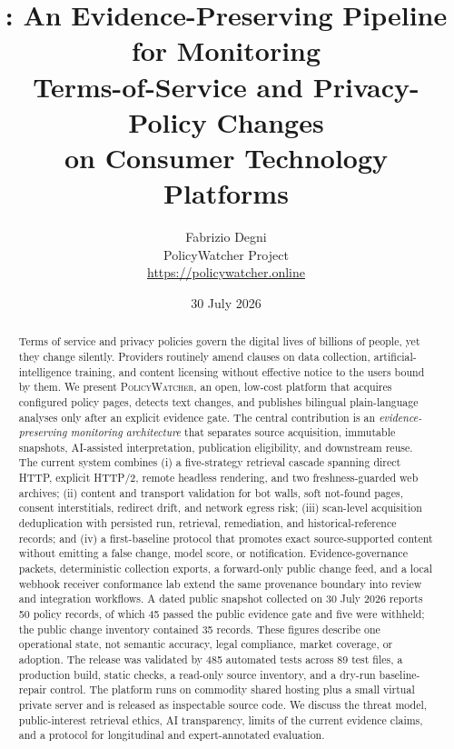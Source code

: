 \documentclass[11pt]{article}
\title{\pw: An Evidence-Preserving Pipeline for Monitoring\\
Terms-of-Service and Privacy-Policy Changes\\
on Consumer Technology Platforms}
\author{
  Fabrizio Degni\\
  \small PolicyWatcher Project\\
  \small \url{https://policywatcher.online}
}
\date{30 July 2026}
\newcommand{\pw}{\textsc{PolicyWatcher}}
\begin{document}
\maketitle

\begin{abstract}
Terms of service and privacy policies govern the digital lives of billions of
people, yet they change silently. Providers routinely amend clauses on data
collection, artificial-intelligence training, and content licensing without
effective notice to the users bound by them. We present \pw, an open, low-cost
platform that acquires configured policy pages, detects text changes, and
publishes bilingual plain-language analyses only after an explicit evidence
gate. The central contribution is an \emph{evidence-preserving monitoring
architecture} that separates source acquisition, immutable snapshots,
AI-assisted interpretation, publication eligibility, and downstream reuse. The
current system combines (i) a five-strategy retrieval cascade spanning direct
HTTP, explicit HTTP/2, remote headless rendering, and two freshness-guarded web
archives; (ii) content and transport validation for bot walls, soft not-found
pages, consent interstitials, redirect drift, and network egress risk; (iii)
scan-level acquisition deduplication with persisted run, retrieval, remediation,
and historical-reference records; and (iv) a first-baseline protocol that
promotes exact source-supported content without emitting a false change, model
score, or notification. Evidence-governance packets, deterministic collection
exports, a forward-only public change feed, and a local webhook receiver
conformance lab extend the same provenance boundary into review and integration
workflows. A dated public snapshot collected on 30 July 2026 reports 50 policy
records, of which 45 passed the public evidence gate and five were withheld;
the public change inventory contained 35 records. These figures describe one
operational state, not semantic accuracy, legal compliance, market coverage, or
adoption. The release was validated by 485 automated tests across 89 test files,
a production build, static checks, a read-only source inventory, and a dry-run
baseline-repair control. The platform runs on commodity shared hosting plus a
small virtual private server and is released as inspectable source code. We
discuss the threat model, public-interest retrieval ethics, AI transparency,
limits of the current evidence claims, and a protocol for longitudinal and
expert-annotated evaluation.
\end{abstract}
\end{document}
